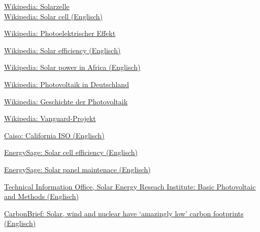 \newpage
\begin{thebibliography}{9}
        \href{https://de.wikipedia.org/wiki/Solarzelle}{
            Wikipedia: Solarzelle
        }\\
        \href{https://en.wikipedia.org/wiki/Solar_cell}{
            Wikipedia: Solar cell (Englisch)
        }

        \href{https://de.wikipedia.org/wiki/Photoelektrischer_Effekt}{
            Wikipedia: Photoelektrischer Effekt
        }

        \href{https://en.wikipedia.org/wiki/Solar_cell_efficiency}{
            Wikipedia: Solar efficiency (Englisch)
        }

        \href{https://en.wikipedia.org/wiki/Solar_power_in_Africa}{
            Wikipedia: Solar power in Africa (Englisch)
        }

        \href{https://de.wikipedia.org/wiki/Photovoltaik_in_Deutschland}{
            Wikipedia: Photovoltaik in Deutschland
        }

        \href{https://de.wikipedia.org/wiki/Geschichte_der_Photovoltaik}{
            Wikipedia: Geschichte der Photovoltaik
        }

        \href{https://de.wikipedia.org/wiki/Vanguard-Projekt}{
            Wikipedia: Vanguard-Projekt
        }

        \href{http://www.caiso.com/TodaysOutlook/Pages/index.html}{
            Caiso: California ISO (Englisch)
        }

        \href{https://news.energysage.com/what-are-the-most-efficient-solar-panels-on-the-market/}{
            EnergySage: Solar cell efficiency (Englisch)
        }

        \href{https://www.energysage.com/solar/101/solar-panel-maintenance/}{
            EnergySage: Solar panel maintenace (Englisch)
        }

        \href{https://www.nrel.gov/docs/legosti/old/1448.pdf}{
            Technical Information Office, Solar Energy Reseach Institute:
            Basic Photovoltaic and Methods (Englisch)
        }

        \href{https://www.carbonbrief.org/solar-wind-nuclear-amazingly-low-carbon-footprints}{
            CarbonBrief: Solar, wind and nuclear have ‘amazingly low’
            carbon footprints (Englisch)
        }


\end{thebibliography}
